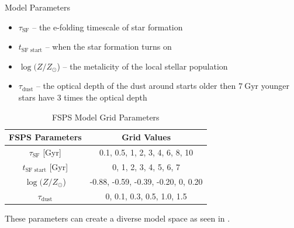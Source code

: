 \documentclass[final]{beamer}
\newlength{\onecolwid}
\newlength{\twocolwid}
\begin{document}
\begin{frame}[t]
\begin{columns}[t]
\begin{column}{\twocolwid}
\begin{columns}
\begin{column}{\onecolwid}
\begin{block}{Model Parameters}
\begin{itemize}
    \item $\tau_{\text{SF}}$ -- the e-folding timescale of star formation
    \item $t_{\text{SF start}}$ -- when the star formation turns on
    \item $\log(Z/Z_{\odot}$) -- the metalicity of the local stellar population
    \item $\tau_{\text{dust}}$ -- the optical depth of the dust around starts older then $7~\text{Gyr}$ younger stars have 3 times the optical depth
\end{itemize}



\begin{table}[]
    \centering
    \begin{tabular}{c c}
    \hline
    \hline
     FSPS Parameters    & Grid Values \\
    \hline
     $\tau_{\text{SF}}$ [Gyr] & 0.1, 0.5, 1, 2, 3, 4, 6, 8, 10 \\
     $t_{\text{SF start}}$ [Gyr] & 0, 1, 2, 3, 4, 5, 6, 7 \\
     $\log(Z/Z_{\odot}$)    & -0.88, -0.59, -0.39, -0.20, 0, 0.20 \\
     $\tau_{\text{dust}}$ & 0, 0.1, 0.3, 0.5, 1.0, 1.5 \\
    \hline
    \end{tabular}
    \caption{FSPS Model Grid Parameters}
    \label{tab:fsps-param}
\end{table}

These parameters can create a diverse model space as seen in .


\end{block}
\end{column}
\end{columns}
\end{column}
\end{columns}
\end{frame}
\end{document}
